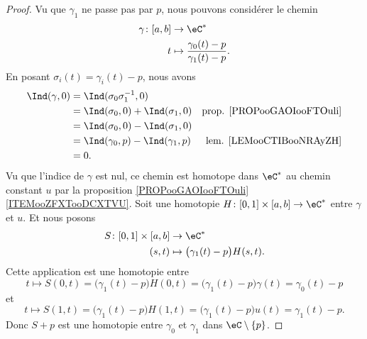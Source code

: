 \begin{proof}
    Vu que \( \gamma_1\) ne passe pas par \( p\), nous pouvons considérer le chemin
    \begin{equation}
        \begin{aligned}
            \gamma\colon \mathopen[ a , b \mathclose]&\to \eC^* \\
            t&\mapsto \frac{ \gamma_0(t)-p }{ \gamma_1(t)-p }. 
        \end{aligned}
    \end{equation}
    En posant \( \sigma_i(t)=\gamma_i(t)-p\), nous avons
    \begin{subequations}
        \begin{align}
            \Ind(\gamma,0)&=\Ind(\sigma_0\sigma_1^{-1},0)\\
            &=\Ind(\sigma_0,0)+\Ind(\sigma_1,0)     &\text{prop. \ref{PROPooGAOIooFTOuli}}\\
            &=\Ind(\sigma_0,0)-\Ind(\sigma_1,0)\\
            &=\Ind(\gamma_0,p)-\Ind(\gamma_1,p)     &\text{lem. \ref{LEMooCTIBooNRAyZH}}\\   
            &=0.
        \end{align}
    \end{subequations}
    Vu que l'indice de \( \gamma\) est nul, ce chemin est homotope dans \( \eC^*\) au chemin constant \( u\) par la proposition \ref{PROPooGAOIooFTOuli}\ref{ITEMooZFXTooDCXTVU}. Soit une homotopie \( H\colon \mathopen[ 0 , 1 \mathclose]\times \mathopen[ a , b \mathclose]\to \eC^*\) entre \( \gamma\) et \( u\). Et nous posons
    \begin{equation}
        \begin{aligned}
            S\colon \mathopen[ 0 , 1 \mathclose]\times \mathopen[ a , b \mathclose]&\to \eC^* \\
            (s,t)&\mapsto \big( \gamma_1(t)-p \big)H(s,t) .
        \end{aligned}
    \end{equation}
    Cette application est une homotopie entre 
    \begin{equation}
        t\mapsto S(0,t)=\big( \gamma_1(t)-p \big)H(0,t)=\big( \gamma_1(t)-p \big)\gamma(t)=\gamma_0(t)-p
    \end{equation}
    et
    \begin{equation}
        t\mapsto S(1,t)=\big( \gamma_1(t)-p \big)H(1,t)=\big( \gamma_1(t)-p \big)u(t)=\gamma_1(t)-p.
    \end{equation}
    Donc \( S+p\) est une homotopie entre \( \gamma_0\) et \( \gamma_1\) dans \( \eC\setminus\{ p \}\).
\end{proof}

